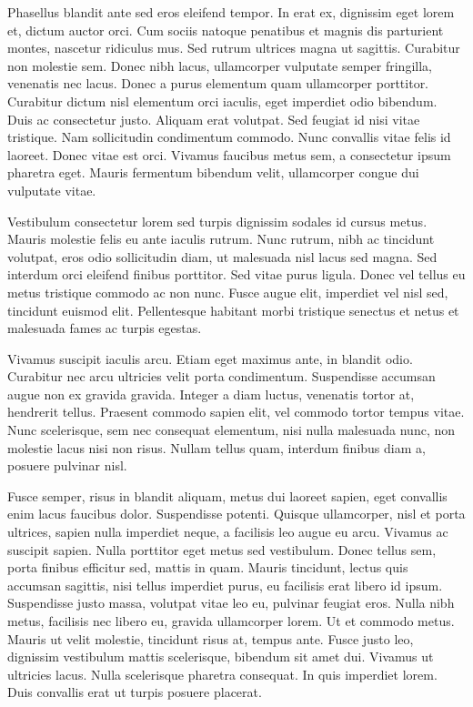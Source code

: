 Phasellus blandit ante sed eros eleifend tempor. In erat ex, dignissim eget lorem et, dictum auctor orci. Cum sociis natoque penatibus et magnis dis parturient montes, nascetur ridiculus mus. Sed rutrum ultrices magna ut sagittis. Curabitur non molestie sem. Donec nibh lacus, ullamcorper vulputate semper fringilla, venenatis nec lacus. Donec a purus elementum quam ullamcorper porttitor. Curabitur dictum nisl elementum orci iaculis, eget imperdiet odio bibendum. Duis ac consectetur justo. Aliquam erat volutpat. Sed feugiat id nisi vitae tristique. Nam sollicitudin condimentum commodo. Nunc convallis vitae felis id laoreet. Donec vitae est orci. Vivamus faucibus metus sem, a consectetur ipsum pharetra eget. Mauris fermentum bibendum velit, ullamcorper congue dui vulputate vitae.

Vestibulum consectetur lorem sed turpis dignissim sodales id cursus metus. Mauris molestie felis eu ante iaculis rutrum. Nunc rutrum, nibh ac tincidunt volutpat, eros odio sollicitudin diam, ut malesuada nisl lacus sed magna. Sed interdum orci eleifend finibus porttitor. Sed vitae purus ligula. Donec vel tellus eu metus tristique commodo ac non nunc. Fusce augue elit, imperdiet vel nisl sed, tincidunt euismod elit. Pellentesque habitant morbi tristique senectus et netus et malesuada fames ac turpis egestas.

Vivamus suscipit iaculis arcu. Etiam eget maximus ante, in blandit odio. Curabitur nec arcu ultricies velit porta condimentum. Suspendisse accumsan augue non ex gravida gravida. Integer a diam luctus, venenatis tortor at, hendrerit tellus. Praesent commodo sapien elit, vel commodo tortor tempus vitae. Nunc scelerisque, sem nec consequat elementum, nisi nulla malesuada nunc, non molestie lacus nisi non risus. Nullam tellus quam, interdum finibus diam a, posuere pulvinar nisl.

Fusce semper, risus in blandit aliquam, metus dui laoreet sapien, eget convallis enim lacus faucibus dolor. Suspendisse potenti. Quisque ullamcorper, nisl et porta ultrices, sapien nulla imperdiet neque, a facilisis leo augue eu arcu. Vivamus ac suscipit sapien. Nulla porttitor eget metus sed vestibulum. Donec tellus sem, porta finibus efficitur sed, mattis in quam. Mauris tincidunt, lectus quis accumsan sagittis, nisi tellus imperdiet purus, eu facilisis erat libero id ipsum. Suspendisse justo massa, volutpat vitae leo eu, pulvinar feugiat eros. Nulla nibh metus, facilisis nec libero eu, gravida ullamcorper lorem. Ut et commodo metus. Mauris ut velit molestie, tincidunt risus at, tempus ante. Fusce justo leo, dignissim vestibulum mattis scelerisque, bibendum sit amet dui. Vivamus ut ultricies lacus. Nulla scelerisque pharetra consequat. In quis imperdiet lorem. Duis convallis erat ut turpis posuere placerat.

